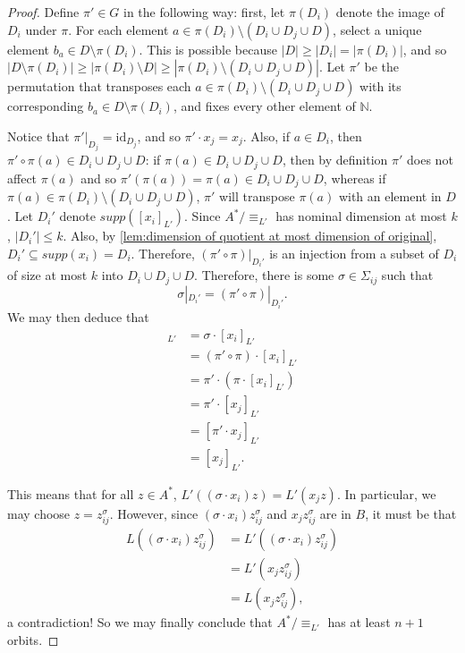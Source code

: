 \documentclass[11pt,a4paper]{amsart}
\theoremstyle{definition}
\newcommand{\bb}{\mathbb}
\begin{document}
\begin{proof}
    Define $\pi' \in G$ in the following way: first, let $\pi(D_i)$ denote the image of $D_i$ under $\pi$.
    For each element $a \in \pi(D_i) \setminus (D_i \cup D_j \cup D)$, select a unique element $b_a \in D \setminus \pi(D_i)$.
    This is possible because $|D| \geq |D_i| = |\pi(D_i)|$, and so $|D \setminus \pi(D_i)| \geq |\pi(D_i) \setminus D| \geq |\pi(D_i) \setminus (D_i \cup D_j \cup D)|$. 
    Let $\pi'$ be the permutation that transposes each $a \in \pi(D_i) \setminus (D_i \cup D_j \cup D)$ with its corresponding $b_a \in D \setminus \pi(D_i)$, and fixes every other element of $\bb N$. 

    Notice that $\pi'|_{D_j} = \mathrm{id}_{D_j}$, and so $\pi' \cdot x_j = x_j$. 
    Also, if $a \in D_i$, then $\pi' \circ \pi(a) \in D_i \cup D_j \cup D$: if $\pi(a) \in D_i \cup D_j \cup D$, then by definition $\pi'$ does not affect $\pi(a)$ and so $\pi'(\pi(a)) = \pi(a) \in D_i \cup D_j \cup D$, whereas if $\pi(a) \in \pi(D_i) \setminus (D_i \cup D_j \cup D)$, $\pi'$ will transpose $\pi(a)$ with an element in $D$. 
    Let $D_i'$ denote $supp([x_i]_{L'})$.
    Since $A^* / \equiv_{L'}$ has nominal dimension at most $k$, $|D_i'| \leq k$.
    Also, by \autoref{lem:dimension of quotient at most dimension of original}, $D_i' \subseteq supp(x_i) = D_i$.
    Therefore, $(\pi' \circ \pi)|_{D_i'}$ is an injection from a subset of $D_i$ of size at most $k$ into $D_i \cup D_j \cup D$. 
    Therefore, there is some $\sigma \in \Sigma_{ij}$ such that
    \[
        \sigma|_{D_i'} = (\pi' \circ \pi)|_{D_i'}.
    \]
    We may then deduce that 
    \begin{align*}
        [\sigma \cdot x_i]_{L'} &= \sigma \cdot [x_i]_{L'} \\
        &= (\pi' \circ \pi) \cdot [x_i]_{L'} \\
        &= \pi' \cdot (\pi \cdot [x_i]_{L'}) \\
        &= \pi' \cdot [x_j]_{L'} \\
        &= [\pi' \cdot x_j]_{L'} \\
        &= [x_j]_{L'}.
    \end{align*}

    This means that for all $z \in A^*$, $L'((\sigma \cdot x_i) z) = L'(x_j z)$.
    In particular, we may choose $z = z^\sigma_{ij}$.
    However, since $(\sigma \cdot x_i) z^\sigma_{ij}$ and $x_j z^\sigma_{ij}$ are in $B$, it must be that
    \begin{align*}
        L((\sigma \cdot x_i) z^\sigma_{ij}) &= L'((\sigma \cdot x_i) z^\sigma_{ij}) \\
        &= L'(x_j z^\sigma_{ij}) \\
        &= L(x_j z^\sigma_{ij}),
    \end{align*}
    a contradiction!
    So we may finally conclude that $A^* / \equiv_{L'}$ has at least $n+1$ orbits.    
\end{proof}
\end{document}
